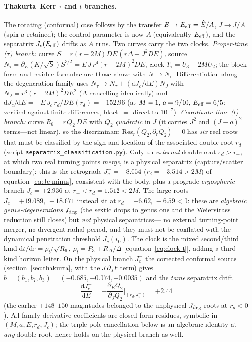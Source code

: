 \documentclass[12pt]{iopart}
\theoremstyle{plain}
\theoremstyle{definition}
\theoremstyle{remark}
\newcommand{\Ehat}{\hat E}
\newcommand{\Jc}{J_{c}}
\newcommand{\dd}{\mathrm{d}}
\begin{document}
\paragraph{Thakurta--Kerr $\tau$ and $t$ branches.}
The rotating (conformal) case follows by the transfer $E\to E_{\rm eff}=\Ehat/A$,
$J\to J/A$ (spin $a$ retained); the control parameter is now $A$ (equivalently $E_{\rm eff}$), and
the separatrix $\Jc(E_{\rm eff})$ drifts as $A$ runs. Two curves carry the two clocks.
\emph{Proper-time ($\tau$) branch:} curve $S=r(r-2M)DE\,(r\Delta-J^2DE)$, source
$N_\tau=\partial_E(K/\sqrt S)S^{3/2}=E\,J\,r^4(r-2M)^2DE$, clock
$T_\tau=U_3-2MU_2$; the block form and residue formulae are those above with
$N\to N_\tau$. Differentiation along the degeneration family uses $N_\tau\to N_\tau+(\dd\Jc/\dd E)N_J$ with
$N_J=r^3(r-2M)^2DE^2$ ($\Delta$ cancelling identically) and
$\dd\Jc/\dd E=-E\,\Jc\,r_d/DE(r_d)=-152.96$ (at $M=1,\,a=9/10,\,E_{\rm eff}=6/5$;
verified against finite differences, block $=$ direct to $10^{-7}$).
\emph{Coordinate-time ($t$) branch:} curve $R_6=r\,Q_2\,DE$ with $Q_2$
\emph{quadratic} in $J$ (it carries $J^2$ and $(J-a)^2$ terms---not linear), so the
discriminant $\mathrm{Res}_r(Q_2,\partial_r Q_2)=0$ has \emph{six} real roots that
must be classified by the sign and location of the associated double root $r_d$
(script \texttt{separatrix\_classification.py}). Only an \emph{external} double
root $r_d>r_+$, at which two real turning points \emph{merge}, is a physical
separatrix (capture$/$scatter boundary): this is the retrograde $\Jc^-=-8.054$
($r_d=+3.514>2M$) of equation~\eqref{eq:Jc-minus}, consistent with the body, plus a
prograde \emph{ergospheric} branch $\Jc=+2.936$ at $r_+<r_d=1.512<2M$. The large
roots $\Jc=+19.089,\,-18.671$ instead sit at $r_d=-6.62,\,-6.59<0$: these are
\emph{algebraic genus-degenerations} $J_{\rm deg}$ (the sextic drops to genus one
and the Weierstrass reduction still closes) but \emph{not} physical separatrices---
no external turning-point merger, no divergent radial period, and they must not be
conflated with the dynamical penetration threshold $J_c(v_0)$. The clock is the
mixed second/third kind $\dd t/\dd r=\rho_t/\sqrt{R_6}$, $\rho_t=P_3+R_\Delta/\Delta$
[equation~\eqref{eq:clock-t}], adding a third-kind horizon letter. On the physical branch
$\Jc^-$ the corrected conformal source (section~\ref{sec:thakurta}, with the
$J\,\partial_J F$ term) gives $b=(b_1,b_2,b_3)=(-0.685,-0.074,-0.0035)$ and the
\emph{tame} separatrix drift
\begin{equation}
\frac{\dd\Jc^-}{\dd E}=-\frac{\partial_E Q_2}{\partial_J Q_2}\bigg|_{(r_d,\Jc^-)}=+2.44
\end{equation}
(the earlier $\mp148$--$150$ magnitudes belonged to the unphysical $J_{\rm deg}$
roots at $r_d<0$). All family-derivative coefficients are closed-form residues, symbolic in
$(M,a,E,r_d,\Jc)$; the triple-pole cancellation below is an algebraic identity at
\emph{any} double root, hence holds on the physical branch as well.
\end{document}
